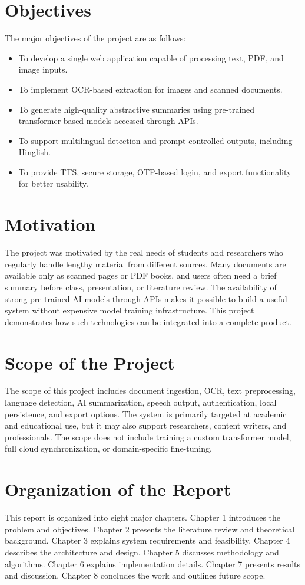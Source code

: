 \documentclass[12pt, a4paper]{report}
\begin{document}
\section{Objectives}
The major objectives of the project are as follows:
\begin{itemize}
  \item To develop a single web application capable of processing text, PDF, and image inputs.
  \item To implement OCR-based extraction for images and scanned documents.
  \item To generate high-quality abstractive summaries using pre-trained transformer-based models accessed through APIs.
  \item To support multilingual detection and prompt-controlled outputs, including Hinglish.
  \item To provide TTS, secure storage, OTP-based login, and export functionality for better usability.
\end{itemize}

\section{Motivation}
The project was motivated by the real needs of students and researchers who regularly handle lengthy material from different sources. Many documents are available only as scanned pages or PDF books, and users often need a brief summary before class, presentation, or literature review. The availability of strong pre-trained AI models through APIs makes it possible to build a useful system without expensive model training infrastructure. This project demonstrates how such technologies can be integrated into a complete product.

\section{Scope of the Project}
The scope of this project includes document ingestion, OCR, text preprocessing, language detection, AI summarization, speech output, authentication, local persistence, and export options. The system is primarily targeted at academic and educational use, but it may also support researchers, content writers, and professionals. The scope does not include training a custom transformer model, full cloud synchronization, or domain-specific fine-tuning.

\section{Organization of the Report}
This report is organized into eight major chapters. Chapter 1 introduces the problem and objectives. Chapter 2 presents the literature review and theoretical background. Chapter 3 explains system requirements and feasibility. Chapter 4 describes the architecture and design. Chapter 5 discusses methodology and algorithms. Chapter 6 explains implementation details. Chapter 7 presents results and discussion. Chapter 8 concludes the work and outlines future scope.
\end{document}
